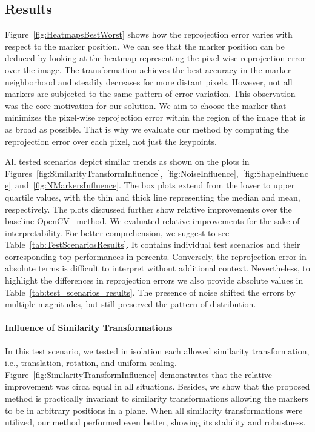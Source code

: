 \subsection{Results}
\label{ssec:EvaluationResults}

Figure~\ref{fig:HeatmapsBestWorst} shows how the reprojection error varies with respect to the marker position. We can see that the marker position can be deduced by looking at the heatmap representing the pixel-wise reprojection error over the image. The transformation achieves the best accuracy in the marker neighborhood and steadily decreases for more distant pixels. However, not all markers are subjected to the same pattern of error variation. This observation was the core motivation for our solution. We aim to choose the marker that minimizes the pixel-wise reprojection error within the region of the image that is as broad as possible. That is why we evaluate our method by computing the reprojection error over each pixel, not just the keypoints.

All tested scenarios depict similar trends as shown on the plots in Figures~\ref{fig:SimilarityTransformInfluence},~\ref{fig:NoiseInfluence},~\ref{fig:ShapeInfluence}~and~\ref{fig:NMarkersInfluence}. The box plots extend from the lower to upper quartile values, with the thin and thick line representing the median and mean, respectively. The plots discussed further show relative improvements over the baseline OpenCV~\cite{bradski2008learning} method. We evaluated relative improvements for the sake of interpretability. For better comprehension, we suggest to see Table~\ref{tab:TestScenariosResults}. It contains individual test scenarios and their corresponding top performances in percents. Conversely, the reprojection error in absolute terms is difficult to interpret without additional context. Nevertheless, to highlight the differences in reprojection errors we also provide absolute values in Table~\ref{tab:test_scenarios_results}. The presence of noise shifted the errors by multiple magnitudes, but still preserved the pattern of distribution.

\paragraph{Influence of Similarity Transformations}
In this test scenario, we tested in isolation each allowed similarity transformation, i.e., translation, rotation, and uniform scaling. Figure~\ref{fig:SimilarityTransformInfluence} demonstrates that the relative improvement was circa equal in all situations. Besides, we show that the proposed method is practically invariant to similarity transformations allowing the markers to be in arbitrary positions in a plane. When all similarity transformations were utilized, our method performed even better, showing its stability and robustness.

